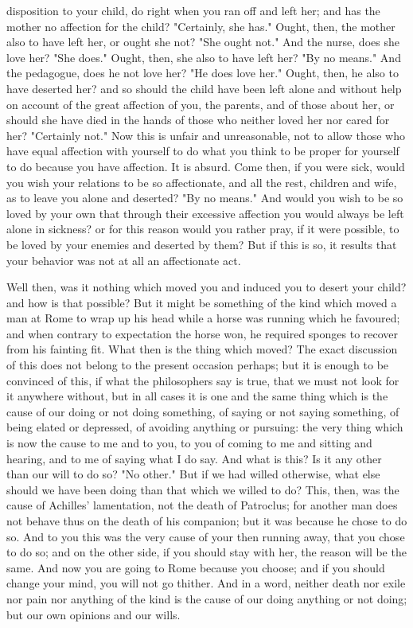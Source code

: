 \documentclass[a4paper]{article}
\begin{document}
disposition to your child, do right when you ran off and left her;
and has the mother no affection for the child? "Certainly, she has."
Ought, then, the mother also to have left her, or ought she not? "She
ought not." And the nurse, does she love her? "She does." Ought, then,
she also to have left her? "By no means." And the pedagogue, does
he not love her? "He does love her." Ought, then, he also to have
deserted her? and so should the child have been left alone and without
help on account of the great affection of you, the parents, and of
those about her, or should she have died in the hands of those who
neither loved her nor cared for her? "Certainly not." Now this is
unfair and unreasonable, not to allow those who have equal affection
with yourself to do what you think to be proper for yourself to do
because you have affection. It is absurd. Come then, if you were sick,
would you wish your relations to be so affectionate, and all the rest,
children and wife, as to leave you alone and deserted? "By no means."
And would you wish to be so loved by your own that through their excessive
affection you would always be left alone in sickness? or for this
reason would you rather pray, if it were possible, to be loved by
your enemies and deserted by them? But if this is so, it results that
your behavior was not at all an affectionate act. 

Well then, was it nothing which moved you and induced you to desert
your child? and how is that possible? But it might be something of
the kind which moved a man at Rome to wrap up his head while a horse
was running which he favoured; and when contrary to expectation the
horse won, he required sponges to recover from his fainting fit. What
then is the thing which moved? The exact discussion of this does not
belong to the present occasion perhaps; but it is enough to be convinced
of this, if what the philosophers say is true, that we must not look
for it anywhere without, but in all cases it is one and the same thing
which is the cause of our doing or not doing something, of saying
or not saying something, of being elated or depressed, of avoiding
anything or pursuing: the very thing which is now the cause to me
and to you, to you of coming to me and sitting and hearing, and to
me of saying what I do say. And what is this? Is it any other than
our will to do so? "No other." But if we had willed otherwise, what
else should we have been doing than that which we willed to do? This,
then, was the cause of Achilles' lamentation, not the death of Patroclus;
for another man does not behave thus on the death of his companion;
but it was because he chose to do so. And to you this was the very
cause of your then running away, that you chose to do so; and on the
other side, if you should stay with her, the reason will be the same.
And now you are going to Rome because you choose; and if you should
change your mind, you will not go thither. And in a word, neither
death nor exile nor pain nor anything of the kind is the cause of
our doing anything or not doing; but our own opinions and our wills.
\end{document}
